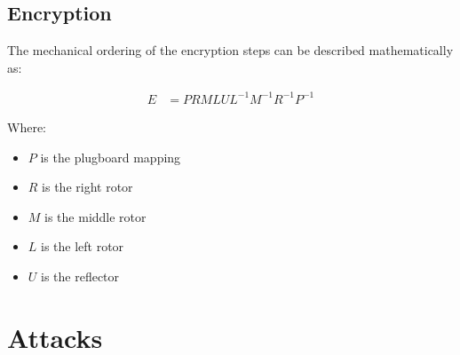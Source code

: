 \documentclass{article}
\begin{document}
\subsection{Encryption}
The mechanical ordering of the encryption steps can be described
mathematically as:

\begin{align*}
  E &= PRMLUL^{-1}M^{-1}R^{-1}P^{-1}
\end{align*}

Where:
\begin{itemize}
\item $P$ is the plugboard mapping
\item $R$ is the right rotor
\item $M$ is the middle rotor
\item $L$ is the left rotor
\item $U$ is the reflector
\end{itemize}


\section{Attacks}
\end{document}
